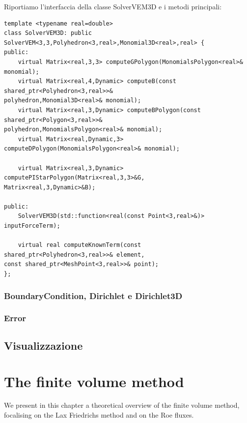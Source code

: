 \documentclass[oneside,12pt]{book}  %
\theoremstyle{plain}
\theoremstyle{definition}
\theoremstyle{remark}
\numberwithin{equation}{chapter} %
\begin{document}
Riportiamo l'interfaccia della classe SolverVEM3D e i metodi principali:

\begin{verbatim}
template <typename real=double>
class SolverVEM3D: public SolverVEM<3,3,Polyhedron<3,real>,Monomial3D<real>,real> {
public:
    virtual Matrix<real,3,3> computeGPolygon(MonomialsPolygon<real>& monomial);
    virtual Matrix<real,4,Dynamic> computeB(const shared_ptr<Polyhedron<3,real>>& 
polyhedron,Monomial3D<real>& monomial);
    virtual Matrix<real,3,Dynamic> computeBPolygon(const shared_ptr<Polygon<3,real>>& 
polyhedron,MonomialsPolygon<real>& monomial);
    virtual Matrix<real,Dynamic,3> computeDPolygon(MonomialsPolygon<real>& monomial);
		
    virtual Matrix<real,3,Dynamic> computePIStarPolygon(Matrix<real,3,3>&G,
Matrix<real,3,Dynamic>&B);
	
public:
    SolverVEM3D(std::function<real(const Point<3,real>&)> inputForceTerm);
 
    virtual real computeKnownTerm(const shared_ptr<Polyhedron<3,real>>& element,
const shared_ptr<MeshPoint<3,real>>& point);	
};

\end{verbatim}

\subsection{BoundaryCondition, Dirichlet e Dirichlet3D}

\subsection{Error}

\section{Visualizzazione}
\label{sec:visualizzazione}



\chapter{The finite volume method}
We present in this chapter a theoretical overview of the finite volume
method, focalising on the Lax Friedrichs method and on the Roe
fluxes. 
\end{document}
